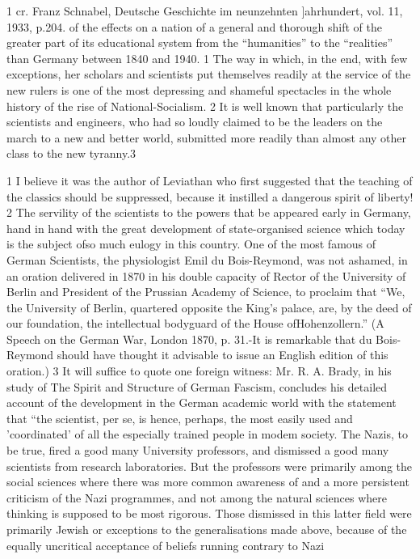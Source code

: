 \documentclass[11pt,openany]{book}
\begin{document}
1 cr. Franz Schnabel, Deutsche Geschichte im neunzehnten ]ahrhundert, vol. 11, 1933, p.204. of the effects on a nation of a general and thorough shift of the greater part of its educational system from the ``humanities'' to the ``realities'' than Germany between 1840 and 1940. 1 The way in which, in the end, with few exceptions, her scholars and scientists put themselves readily at the service of the new rulers is one of the most depressing and shameful spectacles in the whole history of the rise of National-Socialism. 2 It is well known that particularly the scientists and engineers, who had so loudly claimed to be the leaders on the march to a new and better world, submitted more readily than almost any other class to the new tyranny.3

1 I believe it was the author of Leviathan who first suggested that the teaching of the classics should be suppressed, because it instilled a dangerous spirit of liberty! 2 The servility of the scientists to the powers that be appeared early in Germany, hand in hand with the great development of state-organised science which today is the subject ofso much eulogy in this country. One of the most famous of German Scientists, the physiologist Emil du Bois-Reymond, was not ashamed, in an oration delivered in 1870 in his double capacity of Rector of the University of Berlin and President of the Prussian Academy of Science, to proclaim that ``We, the University of Berlin, quartered opposite the King's palace, are, by the deed of our foundation, the intellectual bodyguard of the House ofHohenzollern.'' (A Speech on the German War, London 1870, p. 31.-It is remarkable that du Bois-Reymond should have thought it advisable to issue an English edition of this oration.) 3 It will suffice to quote one foreign witness: Mr. R. A. Brady, in his study of The Spirit and Structure of German Fascism, concludes his detailed account of the development in the German academic world with the statement that ``the scientist, per se, is hence, perhaps, the most easily used and 'coordinated' of all the especially trained people in modem society. The Nazis, to be true, fired a good many University professors, and dismissed a good many scientists from research laboratories. But the professors were primarily among the social sciences where there was more common awareness of and a more persistent criticism of the Nazi programmes, and not among the natural sciences where thinking is supposed to be most rigorous. Those dismissed in this latter field were primarily Jewish or exceptions to the generalisations made above, because of the equally uncritical acceptance of beliefs running contrary to Nazi
\end{document}
